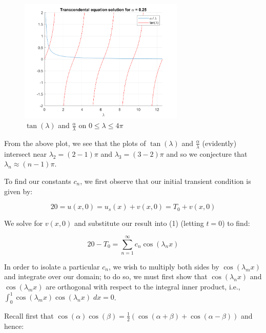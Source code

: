 \begin{solution}
    \begin{figure}[h]
        \centering
        \includegraphics[width=0.7\textwidth]{problem1_transcendental_eigenvalues.png}
        \caption{$\tan(\lambda)$ and $\frac{\alpha}{\lambda}$ on $0 \le \lambda \le 4 \pi$}
    \end{figure}

    \pagebreak

    From the above plot, we see that the plots of $\tan(\lambda)$ and $\frac{\alpha}{\lambda}$ (evidently) intersect near 
    $\lambda_2 = (2 - 1)\pi$ and $\lambda_3 = (3 - 2) \pi$ and so we conjecture that $\lambda_n \approx (n - 1) \pi$.

    To find our constants $c_n$, we first observe that our initial transient condition is given by:

    $$
        20 = u(x, 0) = u_s(x) + v(x, 0) = T_0 + v(x, 0)
    $$
    
    We solve for $v(x, 0)$ and substitute our result into (1) (letting $t = 0$) to find:

    \begin{equation}
        20 - T_0 = \sum_{n=1}^{\infty}{c_n \cos{(\lambda_n x)}}
    \end{equation}

    In order to isolate a particular $c_n$, we wish to multiply both sides by $\cos{(\lambda_m x)}$ and integrate over our domain;
    to do so, we must first show that $\cos{(\lambda_n x)}$ and $\cos{(\lambda_m x)}$ are orthogonal with respect to the integral 
    inner product, i.e., $\int_{0}^{1}{\cos{(\lambda_m x)}\cos{(\lambda_n x)}\; dx} = 0$.

    \pagebreak

    Recall first that $\cos{(\alpha) \cos{(\beta)}} = \frac{1}{2}\left( \cos(\alpha + \beta) + \cos(\alpha - \beta) \right)$
    and hence:


\end{solution}
